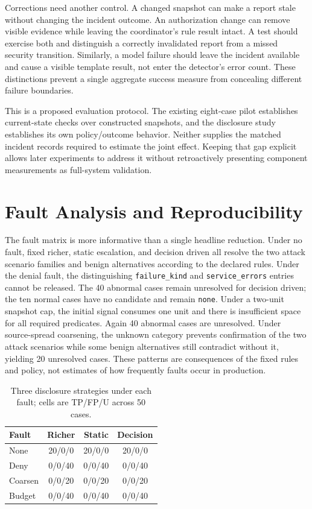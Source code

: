 \documentclass[conference,letterpaper]{IEEEtran}
\begin{document}
Corrections need another control. A changed snapshot can make a report stale without changing the incident outcome. An authorization change can remove visible evidence while leaving the coordinator's rule result intact. A test should exercise both and distinguish a correctly invalidated report from a missed security transition. Similarly, a model failure should leave the incident available and cause a visible template result, not enter the detector's error count. These distinctions prevent a single aggregate success measure from concealing different failure boundaries.

This is a proposed evaluation protocol. The existing eight-case pilot establishes current-state checks over constructed snapshots, and the disclosure study establishes its own policy/outcome behavior. Neither supplies the matched incident records required to estimate the joint effect. Keeping that gap explicit allows later experiments to address it without retroactively presenting component measurements as full-system validation.

\section{Fault Analysis and Reproducibility}
The fault matrix is more informative than a single headline reduction. Under no fault, fixed richer, static escalation, and decision driven all resolve the two attack scenario families and benign alternatives according to the declared rules. Under the denial fault, the distinguishing \texttt{failure\_kind} and \texttt{service\_errors} entries cannot be released. The 40 abnormal cases remain unresolved for decision driven; the ten normal cases have no candidate and remain \texttt{none}. Under a two-unit snapshot cap, the initial signal consumes one unit and there is insufficient space for all required predicates. Again 40 abnormal cases are unresolved. Under source-spread coarsening, the unknown category prevents confirmation of the two attack scenarios while some benign alternatives still contradict without it, yielding 20 unresolved cases. These patterns are consequences of the fixed rules and policy, not estimates of how frequently faults occur in production.

\begin{table}[t]
\centering\caption{Three disclosure strategies under each fault; cells are TP/FP/U across 50 cases.}
\label{tab:matrix}\scriptsize
\begin{tabular}{lccc}\hline
Fault & Richer & Static & Decision \\\hline
None &20/0/0&20/0/0&20/0/0\\
Deny &0/0/40&0/0/40&0/0/40\\
Coarsen &0/0/20&0/0/20&0/0/20\\
Budget &0/0/40&0/0/40&0/0/40\\\hline
\end{tabular}
\end{table}
\end{document}

